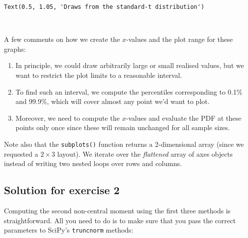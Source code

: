 \documentclass[10pt]{scrartcl}
\makeatletter
\providecommand{\tightlist}{%
      \setlength{\itemsep}{0pt}\setlength{\parskip}{0pt}}
\newcommand{\boxspacing}{\kern\kvtcb@left@rule\kern\kvtcb@boxsep}
\newcommand{\prompt}[4]{
        {\ttfamily\llap{{\color{#2}[#3]:\hspace{3pt}#4}}\vspace{-\baselineskip}}
    }
\makeatother
\begin{document}
            \begin{tcolorbox}[breakable, size=fbox, boxrule=.5pt, pad at break*=1mm, opacityfill=0]
\prompt{Out}{outcolor}{20}{\boxspacing}
\begin{Verbatim}[commandchars=\\\{\}]
Text(0.5, 1.05, 'Draws from the standard-t distribution')
\end{Verbatim}
\end{tcolorbox}
        
    \begin{center}
    \end{center}
    { \hspace*{\fill} \\}
    
    A few comments on how we create the \(x\)-values and the plot range for
these graphs:

\begin{enumerate}
\def\labelenumi{\arabic{enumi}.}
\tightlist
\item
  In principle, we could draw arbitrarily large or small realised
  values, but we want to restrict the plot limits to a reasonable
  interval.
\item
  To find such an interval, we compute the percentiles corresponding to
  0.1\% and 99.9\%, which will cover almost any point we'd want to plot.
\item
  Moreover, we need to compute the \(x\)-values and evaluate the PDF at
  these points only once since these will remain unchanged for all
  sample sizes.
\end{enumerate}

Note also that the \texttt{subplots()} function returns a 2-dimensional
array (since we requested a \(2 \times 3\) layout). We iterate over the
\emph{flattened} array of axes objects instead of writing two nested
loops over rows and columns.

    \hypertarget{solution-for-exercise-2}{%
\subsection{Solution for exercise 2}\label{solution-for-exercise-2}}

Computing the second non-central moment using the first three methods is
straightforward. All you need to do is to make sure that you pass the
correct parameters to SciPy's \texttt{truncnorm} methods:
\end{document}
